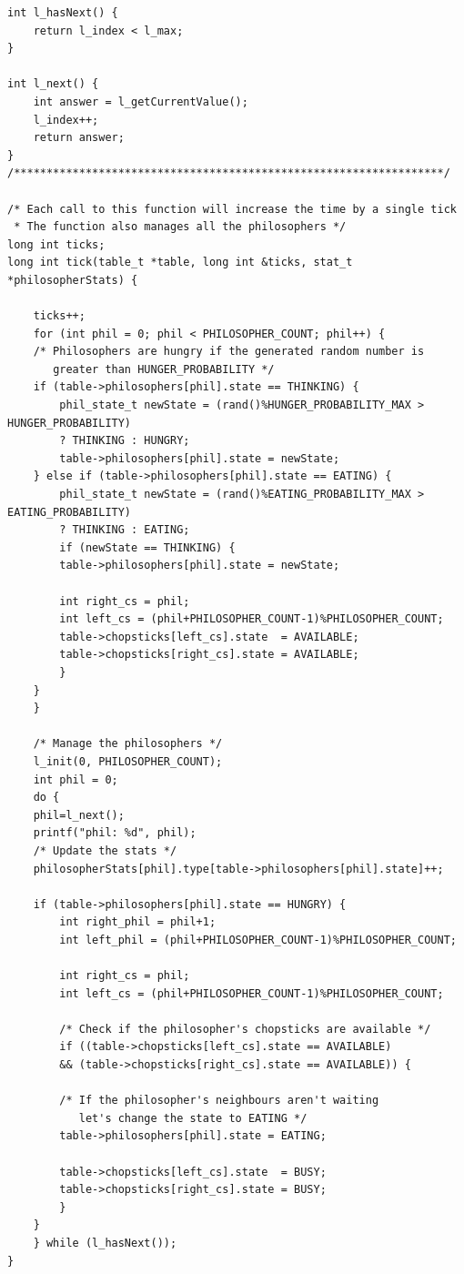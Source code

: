 \documentclass[a4,11pt]{article}
\begin{document}
\begin{verbatim}
int l_hasNext() {
    return l_index < l_max;
}

int l_next() {
    int answer = l_getCurrentValue();
    l_index++;
    return answer;
}
/******************************************************************/

/* Each call to this function will increase the time by a single tick
 * The function also manages all the philosophers */
long int ticks;
long int tick(table_t *table, long int &ticks, stat_t *philosopherStats) {
    
    ticks++;
    for (int phil = 0; phil < PHILOSOPHER_COUNT; phil++) {	
	/* Philosophers are hungry if the generated random number is
	   greater than HUNGER_PROBABILITY */
	if (table->philosophers[phil].state == THINKING) {
	    phil_state_t newState = (rand()%HUNGER_PROBABILITY_MAX > HUNGER_PROBABILITY)
		? THINKING : HUNGRY;
	    table->philosophers[phil].state = newState;
	} else if (table->philosophers[phil].state == EATING) {
	    phil_state_t newState = (rand()%EATING_PROBABILITY_MAX > EATING_PROBABILITY)
		? THINKING : EATING;
	    if (newState == THINKING) {
		table->philosophers[phil].state = newState;
		
		int right_cs = phil;
		int left_cs = (phil+PHILOSOPHER_COUNT-1)%PHILOSOPHER_COUNT;
		table->chopsticks[left_cs].state  = AVAILABLE;
		table->chopsticks[right_cs].state = AVAILABLE;
	    }
	}
    }

    /* Manage the philosophers */
    l_init(0, PHILOSOPHER_COUNT);
    int phil = 0;
    do {
	phil=l_next();
	printf("phil: %d", phil);
	/* Update the stats */
	philosopherStats[phil].type[table->philosophers[phil].state]++;
	
	if (table->philosophers[phil].state == HUNGRY) {
	    int right_phil = phil+1;
	    int left_phil = (phil+PHILOSOPHER_COUNT-1)%PHILOSOPHER_COUNT;
	    
	    int right_cs = phil;
	    int left_cs = (phil+PHILOSOPHER_COUNT-1)%PHILOSOPHER_COUNT;
	    
	    /* Check if the philosopher's chopsticks are available */
	    if ((table->chopsticks[left_cs].state == AVAILABLE)
		&& (table->chopsticks[right_cs].state == AVAILABLE)) {

		/* If the philosopher's neighbours aren't waiting
		   let's change the state to EATING */
		table->philosophers[phil].state = EATING;
		    
		table->chopsticks[left_cs].state  = BUSY;
		table->chopsticks[right_cs].state = BUSY;
	    }
	}
    } while (l_hasNext());
}


\end{verbatim}
\end{document}
